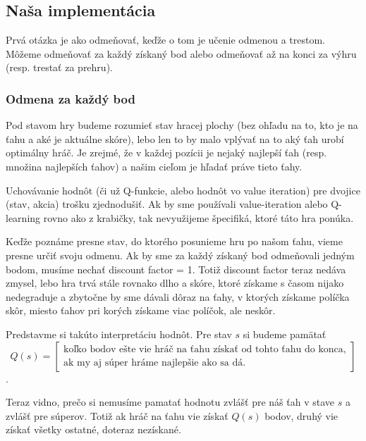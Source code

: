 \documentclass[10pt,a4paper]{article}
\begin{document}
\subsection{Naša implementácia}


Prvá otázka je ako odmeňovať, keďže o tom je učenie odmenou a trestom. Môžeme odmeňovať za každý získaný bod
alebo odmeňovať až na konci za výhru (resp. trestať za prehru).

\subsubsection{Odmena za každý bod}

Pod stavom hry budeme rozumieť stav hracej plochy (bez ohľadu na to, kto je na ťahu a aké je aktuálne skóre), 
lebo len to by malo vplývať na to aký ťah urobí optimálny hráč. 
Je zrejmé, že v každej pozícii je nejaký najlepší ťah (resp. množina najlepších ťahov) a našim cieľom je hľadať práve tieto ťahy. 


Uchovávanie hodnôt (či už Q-funkcie, alebo hodnôt vo value iteration) pre dvojice (stav, akcia) trošku zjednodušiť. 
Ak by sme používali value-iteration alebo Q-learning rovno ako z krabičky, tak nevyužijeme špecifiká, ktoré táto hra ponúka.



Keďže poznáme presne stav, do ktorého posunieme hru po našom ťahu, vieme presne určiť svoju odmenu. Ak by sme za každý získaný bod odmeňovali 
jedným bodom, musíme nechať discount factor = 1. Totiž discount factor teraz nedáva zmysel, lebo hra trvá stále rovnako dlho a skóre, ktoré získame s časom nijako nedegraduje a zbytočne by sme dávali dôraz na ťahy, v ktorých získame políčka skôr, miesto ťahov pri korých získame viac políčok, ale neskôr.

Predstavme si takúto interpretáciu hodnôt. Pre stav $s$ si budeme pamätať 
$$Q(s) = \left[\begin{array}{l}
\mbox{koľko bodov ešte vie hráč na ťahu získať od tohto ťahu do konca,} \\
\mbox{ak my aj súper hráme najlepšie ako sa dá}.
\end{array}\right]$$. 

Teraz vidno, prečo si nemusíme pamatať hodnotu zvlášť pre náš ťah v stave $s$ a zvlášť pre súperov. Totiž ak hráč na ťahu vie získať $Q(s)$ bodov, druhý vie získať všetky ostatné, doteraz nezískané.
\end{document}
